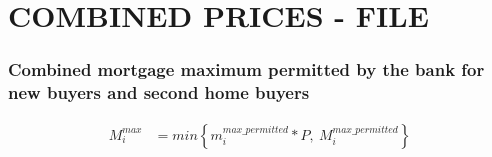 









 



\chapter{COMBINED PRICES - FILE}
\subsection{Combined mortgage maximum permitted by the bank for new buyers and second home buyers}

\begin{align} 
M_i^{max} &= min \left\{ m_i^{max\_permitted}*P, \ M^{max\_permitted}_i \right\} 
\nonumber
\end{align}


